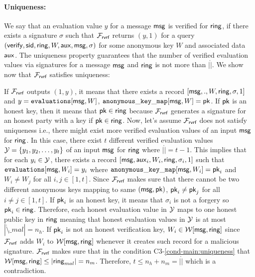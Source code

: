 	\paragraph{Uniqueness:} We say that an evaluation value $ y $ for a message $ \mathsf{msg} $  is verified for $ \mathsf{ring} $, if there exists a signature $ \sigma $ such that $ \mathcal{F}_{\textsf{rvrf}}$ returns $ (y, 1)$ for a query $ (\mathsf{verify}, \textsf{sid}, \mathsf{ring},W,\mathsf{aux},\mathsf{msg},\sigma)$ for some anonymous key $ W $ and associated data $\mathsf{aux} $. The uniqueness property guarantees that the number of verified evaluation values via signatures for a message $ \mathsf{msg} $ and $ \mathsf{ring} $ is not more than $ |\ring| $. We show now that $ \mathcal{F}_{\textsf{rvrf}} $ satisfies uniqueness:
	
	If $ \mathcal{F}_{\textsf{rvrf}} $ outputs $ (1,y) $, it means that there exists a record $ [\mathsf{msg}, ., W,\mathsf{ring}, \sigma,1] $ and $ y = \texttt{evaluations}[\mathsf{msg}, W] $, $ \mathtt{anonymous\_key\_map}[\mathsf{msg}, W]  = \mathsf{pk}$.  If $ \mathsf{pk} $ is an honest key, then it means that $ \mathsf{pk} \in \mathsf{ring} $ because $ \mathcal{F}_{\textsf{rvrf}} $ generates a signature for an honest party with a key if $ \mathsf{pk} \in \mathsf{ring} $. Now,  let's assume $ \mathcal{F}_{\textsf{rvrf}} $ does not satisfy uniqueness i.e., there might exist more verified evaluation values of an input $ \mathsf{msg} $ for $ \mathsf{ring} $.
	In this case, there exist $ t$ different verified evaluation values $ {\mathcal{Y}} = \{y_1, y_2, \ldots, y_t\} $ of an input $ \mathsf{msg} $ for $ \mathsf{ring} $ where $ |\ring| = t-1 $. This implies that for each $ y_i \in {\ensuremath{\mathcal{Y}}} $, there exists a  record $ [\mathsf{msg}, \mathsf{aux}_i, W_i,\mathsf{ring},\sigma_i,1] $ such that  $\texttt{evaluations}[\mathsf{msg},W_i] = y_i $ where $ \mathtt{anonymous\_key\_map}[\mathsf{msg},W_i] = \mathsf{pk}_i $ and $ W_i \neq W_j $ for all $ i,j \in [1,t] $. Since $ \mathcal{F}_{\textsf{rvrf}} $ makes sure that there cannot be two different anonymous keys mapping to same $ (\mathsf{msg}, \mathsf{pk}) $,  $ \mathsf{pk}_i \neq \mathsf{pk}_j $ for all $ i \neq j \in [1,t] $.
	If $ \mathsf{pk}_i $ is an honest key, it means that $ \sigma_i $ is not a forgery so $ \mathsf{pk}_i \in \mathsf{ring} $. Therefore, each honest evaluation value  in $ {\mathcal{Y}} $ maps to one honest public key in $ \mathsf{ring} $ meaning that honest evaluation values in $ {\mathcal{Y}} $ is at most $ |\ring \setminus \ring_{mal}| = n_h $. If $ \mathsf{pk}_i $ is not an honest verification key, $ W_i \in \mathcal{W}[\mathsf{msg},\mathsf{ring}] $ since $ \mathcal{F}_{\textsf{rvrf}} $ adds $ W_i $ to $ \mathcal{W}[\mathsf{msg}, \mathsf{ring}] $ whenever it creates such record for a malicious signature. $ \mathcal{F}_{\textsf{rvrf}} $ makes sure that in the condition C3-\ref{cond-main:uniqueness} that $ \mathcal{W}[\mathsf{msg},\mathsf{ring}] \leq |\mathsf{ring}_{mal}| = n_m$. Therefore, $ t \leq n_h + n_m = |\ring| $ which is a contradiction.
	
